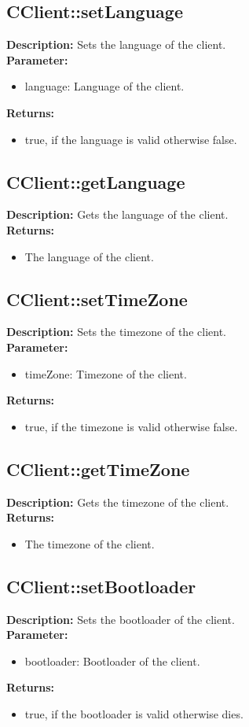\subsection{CClient::setLanguage}
\textbf{Description:} Sets the language of the client.\\
\textbf{Parameter:}
\begin{itemize}
\item language: Language of the client.
\end{itemize}
\textbf{Returns:}
\begin{itemize}
\item true, if the language is valid otherwise false.
\end{itemize}

\subsection{CClient::getLanguage}
\textbf{Description:} Gets the language of the client.\\
\textbf{Returns:}
\begin{itemize}
\item The language of the client.
\end{itemize}

\subsection{CClient::setTimeZone}
\textbf{Description:} Sets the timezone of the client.\\
\textbf{Parameter:}
\begin{itemize}
\item timeZone: Timezone of the client.
\end{itemize}
\textbf{Returns:}
\begin{itemize}
\item true, if the timezone is valid otherwise false.
\end{itemize}

\subsection{CClient::getTimeZone}
\textbf{Description:} Gets the timezone of the client.\\
\textbf{Returns:}
\begin{itemize}
\item The timezone of the client.
\end{itemize}

\subsection{CClient::setBootloader}
\textbf{Description:} Sets the bootloader of the client.\\
\textbf{Parameter:}
\begin{itemize}
\item bootloader: Bootloader of the client.
\end{itemize}
\textbf{Returns:}
\begin{itemize}
\item true, if the bootloader is valid otherwise dies.
\end{itemize}

